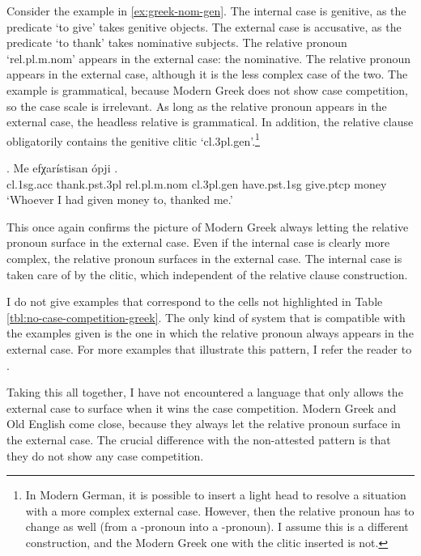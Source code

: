 Consider the example in \ref{ex:greek-nom-gen}.
The internal case is genitive, as the predicate  `to give' takes genitive objects.
The external case is accusative, as the predicate  `to thank' takes nominative subjects.
The relative pronoun  `\ac{rel}.\ac{pl}.\ac{m}.\ac{nom}' appears in the external case: the nominative.
The relative pronoun appears in the external case, although it is the less complex case of the two. The example is grammatical, because Modern Greek does not show case competition, so the case scale is irrelevant. As long as the relative pronoun appears in the external case, the headless relative is grammatical. In addition, the relative clause obligatorily contains the genitive clitic  `\ac{cl}.3\ac{pl}.\ac{gen}'.\footnote{
In Modern German, it is possible to insert a light head to resolve a situation with a more complex external case. However, then the relative pronoun has to change as well (from a -pronoun into a -pronoun). I assume this is a different construction, and the Modern Greek one with the clitic inserted is not.
}

\exg. Me efχarístisan ópji    .\\
 \ac{cl}.1\ac{sg}.\ac{acc} thank.\ac{pst}.3\ac{pl}\scsub{[nom]} \ac{rel}.\ac{pl}.\ac{m}.\ac{nom} \ac{cl}.3\ac{pl}.\ac{gen} have.\ac{pst}.1\ac{sg} give.\ac{ptcp}\scsub{[gen]} money\\
 `Whoever I had given money to, thanked me.'\label{ex:greek-nom-gen}

This once again confirms the picture of Modern Greek always letting the relative pronoun surface in the external case. Even if the internal case is clearly more complex, the relative pronoun surfaces in the external case. The internal case is taken care of by the clitic, which independent of the relative clause construction.

I do not give examples that correspond to the cells not highlighted in Table \ref{tbl:no-case-competition-greek}. The only kind of system that is compatible with the examples given is the one in which the relative pronoun always appears in the external case. For more examples that illustrate this pattern, I refer the reader to .

Taking this all together, I have not encountered a language that only allows the external case to surface when it wins the case competition. Modern Greek and Old English come close, because they always let the relative pronoun surface in the external case. The crucial difference with the non-attested pattern is that they do not show any case competition.

